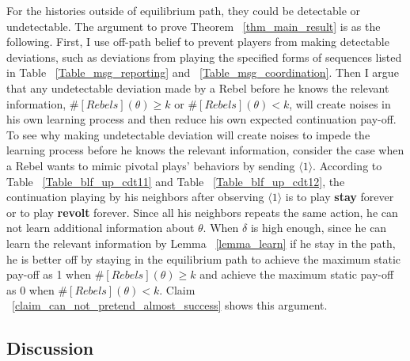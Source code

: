 \documentclass[12pt,letter]{article}
\theoremstyle{definition}
\theoremstyle{remark}
\theoremstyle{claim}
\begin{document}
For the histories outside of equilibrium path, they could be detectable or undetectable. The argument to prove Theorem ~\ref{thm_main_result} is as the following. First, I use off-path belief to prevent players from making detectable deviations, such as deviations from playing the specified forms of sequences listed in Table ~\ref{Table_msg_reporting} and ~\ref{Table_msg_coordination}. Then I argue that any undetectable deviation made by a Rebel before he knows the relevant information, $\#[Rebels](\theta)\geq k$ or $\#[Rebels](\theta)< k$, will create noises in his own learning process and then reduce his own expected continuation pay-off.  To see why making undetectable deviation will create noises to impede the learning process before he knows the relevant information, consider the case when a Rebel wants to mimic pivotal plays' behaviors by sending $\langle 1 \rangle$. According to Table ~\ref{Table_blf_up_cdt11} and Table ~\ref{Table_blf_up_cdt12}, the continuation playing by his neighbors after observing $\langle 1 \rangle$ is to play \textbf{stay} forever or to play \textbf{revolt} forever. Since all his neighbors repeats the same action, he can not learn additional information about $\theta$. When $\delta$ is high enough, since he can learn the relevant information by Lemma ~\ref{lemma_learn} if he stay in the path, he is better off by staying in the equilibrium path to achieve the maximum static pay-off as 1 when $\#[Rebels](\theta)\geq k$ and achieve the maximum static pay-off as 0 when $\#[Rebels](\theta)< k$. Claim ~\ref{claim_can_not_pretend_almost_success} shows this argument.

\subsection{Discussion}
\label{sec:varies}
\end{document}
